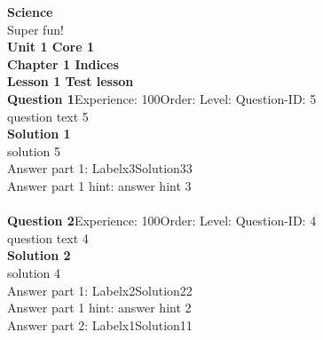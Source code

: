 \documentclass{article}
\begin{document}
\noindent\Huge{\textbf{Science}}\\[5pt]
\noindent\large{Super fun!}\\[20pt]
\noindent\huge{\textbf{Unit 1 Core 1}}\\[18pt]
\noindent\huge{\textbf{Chapter 1 Indices}}\\[15pt]
\noindent\huge{\textbf{Lesson 1 Test lesson}}\\[12pt]
\noindent\textbf{Question 1}\hspace{20pt}Experience: 100\hspace{20pt}Order: \hspace{20pt}Level: \hspace{20pt}Question-ID: 5\\[2pt]
question text 5\\[4pt]
\noindent\textbf{Solution 1}\\[2pt]
solution 5\\[4pt]
Answer part 1: \hspace{10pt}Label\hspace{10pt}x3\hspace{10pt}Solution\hspace{10pt}33\\
Answer part 1 hint: \hspace{15pt}answer hint 3\\
\\[4pt]
\noindent\textbf{Question 2}\hspace{20pt}Experience: 100\hspace{20pt}Order: \hspace{20pt}Level: \hspace{20pt}Question-ID: 4\\[2pt]
question text 4\\[4pt]
\noindent\textbf{Solution 2}\\[2pt]
solution 4\\[4pt]
Answer part 1: \hspace{10pt}Label\hspace{10pt}x2\hspace{10pt}Solution\hspace{10pt}22\\
Answer part 1 hint: \hspace{15pt}answer hint 2\\
Answer part 2: \hspace{10pt}Label\hspace{10pt}x1\hspace{10pt}Solution\hspace{10pt}11\\
\end{document}
